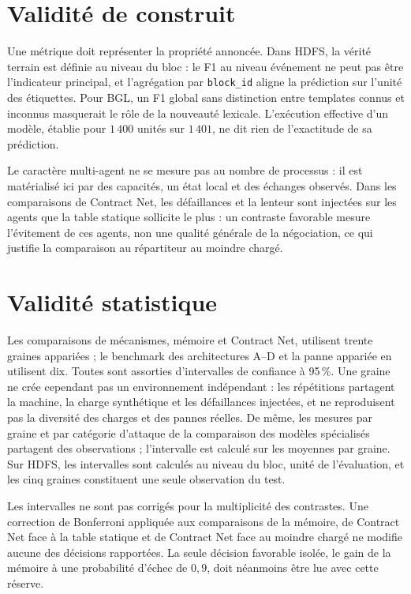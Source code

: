 \section{Validité de construit}

Une métrique doit représenter la propriété annoncée. Dans HDFS, la vérité terrain est définie
au niveau du bloc : le F1 au niveau événement ne peut pas être l'indicateur principal, et
l'agrégation par \texttt{block\_id} aligne la prédiction sur l'unité des étiquettes. Pour
BGL, un F1 global sans distinction entre templates connus et inconnus masquerait le rôle de
la nouveauté lexicale. L'exécution effective d'un
modèle, établie pour $1\,400$ unités sur $1\,401$, ne dit rien de l'exactitude de sa
prédiction.

Le caractère multi-agent ne se mesure pas au nombre de processus : il est matérialisé ici par
des capacités, un état local et des échanges observés. Dans les comparaisons de Contract
Net, les défaillances et la lenteur sont injectées sur les agents que la table statique
sollicite le plus : un contraste favorable mesure l'évitement de ces agents, non une qualité
générale de la négociation, ce qui justifie la comparaison au répartiteur au moindre chargé.

\section{Validité statistique}

Les comparaisons de mécanismes, mémoire et Contract Net, utilisent trente graines appariées ;
le benchmark des architectures A--D et la panne appariée en utilisent dix. Toutes sont
assorties d'intervalles de confiance à 95\,\%. Une graine ne crée cependant pas un
environnement indépendant : les répétitions partagent la machine, la charge synthétique et
les défaillances injectées, et ne reproduisent pas la diversité des charges et des pannes
réelles. De même, les mesures par graine et par catégorie d'attaque de la comparaison des
modèles spécialisés partagent des observations ; l'intervalle est calculé sur les moyennes
par graine. Sur HDFS, les intervalles sont calculés au niveau du bloc, unité de
l'évaluation, et les cinq graines constituent une seule observation du test.

Les intervalles ne sont pas corrigés pour la multiplicité des contrastes. Une correction de
Bonferroni appliquée aux comparaisons de la mémoire, de Contract Net face à la table
statique et de Contract Net face au moindre chargé ne modifie aucune des décisions
rapportées. La seule décision favorable isolée, le gain de la mémoire à une probabilité
d'échec de $0{,}9$, doit néanmoins être lue avec cette réserve.

